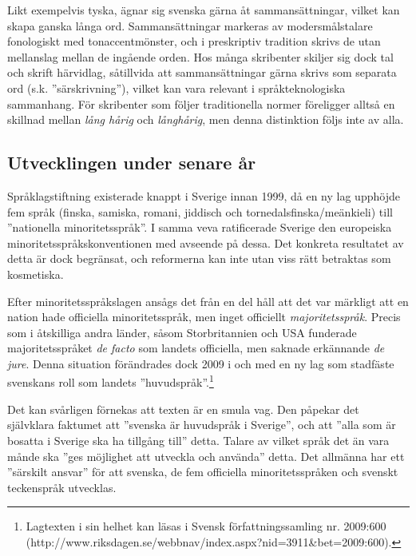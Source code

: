 \begin{multicols}{2}

Likt exempelvis tyska, ägnar sig svenska gärna åt sammansättningar,
vilket kan skapa ganska långa ord. Sammansättningar markeras av
modersmålstalare fonologiskt med tonaccent­mönster, och i preskriptiv
tradition skrivs de utan mellanslag mellan de ingående orden. Hos
många skribenter skiljer sig dock tal och skrift härvidlag, såtillvida
att sammansättningar gärna skrivs som separata ord
(s.k. ''särskrivning''), vilket kan vara relevant i språkteknologiska
sammanhang. För skribenter som följer traditionella normer föreligger
alltså en skillnad mellan \textit{lång hårig} och \textit{långhårig},
men denna distinktion följs inte av alla.

\subsection{Utvecklingen under senare år}

Språklagstiftning existerade knappt i Sverige innan 1999, då en ny lag
upphöjde fem språk (finska, samiska, romani, jiddisch och
tornedalsfinska/meänkieli) till ''nationella minoritetsspråk''. I samma
veva ratificerade Sverige den europeiska minoritetsspråkskonventionen
med avseende på dessa. Det konkreta resultatet av detta är dock
begränsat, och reformerna kan inte utan viss rätt betraktas som
kosmetiska.

Efter minoritetsspråkslagen ansågs det från en del håll att det var
märkligt att en nation hade officiella minoritetsspråk, men inget
officiellt \textit{majoritetsspråk}. Precis som i åtskilliga andra
länder, såsom Storbritannien och USA funderade majoritetsspråket
\textit{de facto} som landets officiella, men saknade erkännande
\textit{de jure}. Denna situation förändrades dock 2009 i och med en
ny lag som stadfäste svenskans roll som landets
''huvudspråk''.\footnote{Lagtexten i sin helhet kan läsas i Svensk
  författningssamling nr. 2009:600
  \\(http://www.riksdagen.se/webbnav/index.aspx?nid=3911\&bet=2009:600).}

Det kan svårligen förnekas att texten är en smula vag. Den påpekar det
självklara faktumet att ''svenska är huvudspråk i Sverige'', och att
''alla som är bosatta i Sverige ska ha tillgång till'' detta. Talare
av vilket språk det än vara månde ska ''ges möjlighet att utveckla och
använda'' detta. Det allmänna har ett ''särskilt ansvar'' för att
svenska, de fem officiella minoritetsspråken och svenskt teckenspråk
utvecklas.


\end{multicols}

